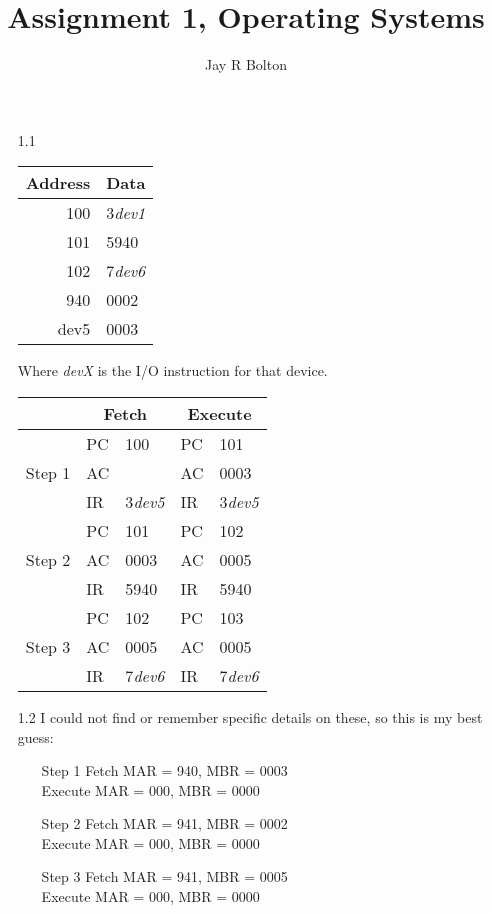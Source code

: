 \documentclass{article}
\title{Assignment 1, Operating Systems}
\author{Jay R Bolton}
\begin{document}
\maketitle

\begin{enumerate}

\item[1.1]  
 \begin{tabular}{r | l} 
 Address & Data \\ \hline
 100 & 3\emph{dev1} \\
 101 & 5940 \\
 102 & 7\emph{dev6} \\
 940 & 0002 \\
 dev5 & 0003
 \end{tabular}

 Where \emph{devX} is the I/O instruction for that device.
 \\

 \begin{tabular}{l | l | l || l | l}
  & \multicolumn{2}{c}{Fetch} & \multicolumn{2}{c}{Execute} \\ \hline
  \multirow{3}{*}{Step 1} & PC & 100 & PC & 101 \\
  & AC & & AC & 0003 \\
  & IR & 3\emph{dev5} & IR & 3\emph{dev5} \\ \hline
  \multirow{3}{*}{Step 2} & PC & 101 & PC & 102 \\
  & AC & 0003 & AC & 0005 \\
  & IR & 5940 & IR & 5940 \\ \hline
  \multirow{3}{*}{Step 3} & PC & 102 & PC & 103 \\
  & AC & 0005 & AC & 0005 \\
  & IR & 7\emph{dev6} & IR & 7\emph{dev6} \\
  \end{tabular}

\item[1.2]
I could not find or remember specific details on these, so this is my best
guess:
\begin{enumerate}
 \item[Step 1]
  Fetch MAR = 940, MBR = 0003 \\
  Execute MAR = 000, MBR = 0000 
 \item[Step 2]
  Fetch MAR = 941, MBR = 0002 \\
  Execute MAR = 000, MBR = 0000
 \item[Step 3]
  Fetch MAR = 941, MBR = 0005\\
  Execute MAR = 000, MBR = 0000
\end{enumerate}
 

\end{enumerate}
\end{document}
